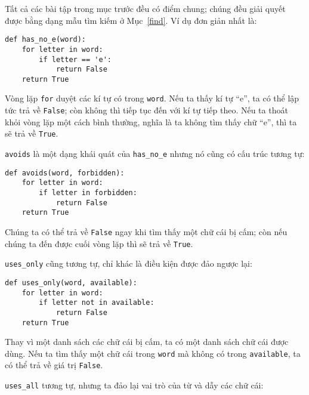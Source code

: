 \documentclass[11pt]{book}
\begin{document}

Tất cả các bài tập trong mục trước đều có điểm chung; chúng đều
giải quyết được bằng dạng mẫu tìm kiếm ở Mục~\ref{find}. Ví dụ đơn giản nhất là:

\beforeverb
\begin{verbatim}
def has_no_e(word):
    for letter in word:
        if letter == 'e':
            return False
    return True
\end{verbatim}
\afterverb
%
Vòng lặp {\tt for} duyệt các kí tự có trong {\tt word}. Nếu ta thấy kí tự
``e'', ta có thể lập tức trả về {\tt False}; còn không thì tiếp tục đến
với kí tự tiếp theo. Nếu ta thoát khỏi vòng lặp một cách bình thường, nghĩa
là ta không tìm thấy chữ ``e'', thì ta sẽ trả về {\tt True}.





{\tt avoids} là một dạng khái quát của \verb"has_no_e" nhưng nó cũng có
cấu trúc tương tự:

\beforeverb
\begin{verbatim}
def avoids(word, forbidden):
    for letter in word:
        if letter in forbidden:
            return False
    return True
\end{verbatim}
\afterverb
%
Chúng ta có thể trả về {\tt False} ngay khi tìm thấy một chữ cái bị cấm; còn
nếu chúng ta đến được cuối vòng lặp thì sẽ trả về {\tt True}.

\verb"uses_only" cũng tương tự, chỉ khác là điều kiện được đảo ngược lại:

\beforeverb
\begin{verbatim}
def uses_only(word, available):
    for letter in word: 
        if letter not in available:
            return False
    return True
\end{verbatim}
\afterverb
%
Thay vì một danh sách các chữ cái bị cấm, ta có một danh sách chữ cái được dùng.
Nếu ta tìm thấy một chữ cái trong {\tt word} mà không có trong 
{\tt available}, ta có thể trả về giá trị {\tt False}.

\verb"uses_all" tương tự, nhưng ta đảo lại vai trò của từ và dẫy các chữ cái:
\end{document}
